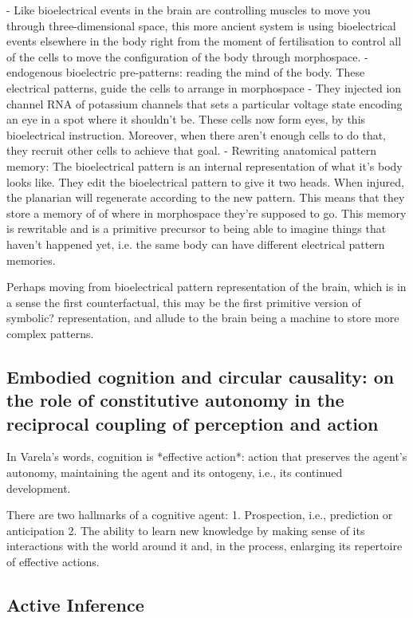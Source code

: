{- Like bioelectrical events in the brain are controlling muscles to move you through three-dimensional space, this more ancient system is using bioelectrical events elsewhere in the body right from the moment of fertilisation to control all of the cells to move the configuration of the body through morphospace.
- endogenous bioelectric pre-patterns: reading the mind of the body. These electrical patterns, guide the cells to arrange in morphospace
- They injected ion channel RNA of potassium channels that sets a particular voltage state encoding an eye in a spot where it shouldn't be. These cells now form eyes, by this bioelectrical instruction. Moreover, when there aren't enough cells to do that, they recruit other cells to achieve that goal. 
- Rewriting anatomical pattern memory: The bioelectrical pattern is an internal representation of what it’s body looks like. They edit the bioelectrical pattern to give it two heads. When injured, the planarian will regenerate according to the new pattern. This means that they store a memory of of where in morphospace they’re supposed to go. This memory is rewritable and is a primitive precursor to being able to imagine things that haven’t happened yet, i.e. the same body can have different electrical pattern memories. 
}

Perhaps moving from bioelectrical pattern representation of the brain, which is in a sense the first counterfactual, this may be the first primitive version of symbolic? representation, and allude to the brain being a machine to store more complex patterns. 

\subsection{Embodied cognition and circular causality: on the role of constitutive autonomy in the reciprocal coupling of perception and action}
\cite{vernon_embodied_2015}
In Varela’s words, cognition is *effective action*: action that preserves the agent’s autonomy, maintaining the agent and its ontogeny, i.e., its continued development.

There are two hallmarks of a cognitive agent:
1. Prospection, i.e., prediction or anticipation
2. The ability to learn new knowledge by making sense of its interactions with the world around it and, in the process, enlarging its repertoire of effective actions.

\subsection{Active Inference}

